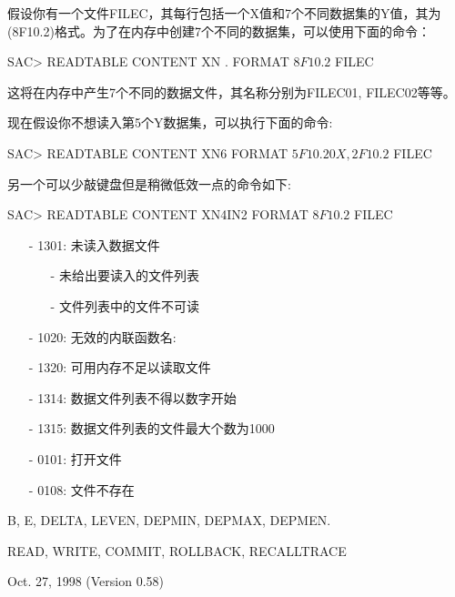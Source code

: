 假设你有一个文件FILEC，其每行包括一个X值和7个不同数据集的Y值，其为(8F10.2)格式。为了在内存中创建7个不同的数据集，可以使用下面的命令：
\begin{SACCode}
SAC> READTABLE CONTENT XN . FORMAT \(8F10.2\) FILEC
\end{SACCode}
这将在内存中产生7个不同的数据文件，其名称分别为FILEC01, FILEC02等等。

现在假设你不想读入第5个Y数据集，可以执行下面的命令:
\begin{SACCode}
SAC> READTABLE CONTENT XN6 FORMAT \(5F10.20X,2F10.2\) FILEC
\end{SACCode}
另一个可以少敲键盘但是稍微低效一点的命令如下:
\begin{SACCode}
SAC> READTABLE CONTENT XN4IN2 FORMAT \(8F10.2\) FILEC
\end{SACCode}

\begin{itemize}
\item[-]1301: 未读入数据文件
	\begin{itemize}
  	\item[-]未给出要读入的文件列表
	\item[-] 文件列表中的文件不可读
	\end{itemize}
\item[-]1020: 无效的内联函数名:
\item[-]1320: 可用内存不足以读取文件
\item[-]1314: 数据文件列表不得以数字开始
\item[-]1315: 数据文件列表的文件最大个数为1000
\end{itemize}

\begin{itemize}
\item[-]0101: 打开文件
\item[-]0108: 文件不存在
\end{itemize}

B, E, DELTA, LEVEN, DEPMIN, DEPMAX, DEPMEN.

READ, WRITE, COMMIT, ROLLBACK, RECALLTRACE

Oct. 27, 1998 (Version 0.58)
